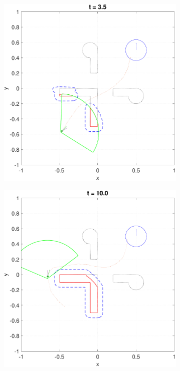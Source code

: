 \begin{figure}
  \label{fig:5D3Dsim}
  \centering
  \begin{subfigure}[t]{0.49\columnwidth} \label{fig:5D3Dsim:1}
    \includegraphics[width=\columnwidth]{fig/P5D_Dubins/36}
  \end{subfigure}
  \begin{subfigure}[t]{0.49\columnwidth} \label{fig:5D3Dsim:2}
    \includegraphics[width=\columnwidth]{fig/P5D_Dubins/101}
    \caption{}
  \end{subfigure}  


\end{figure}
